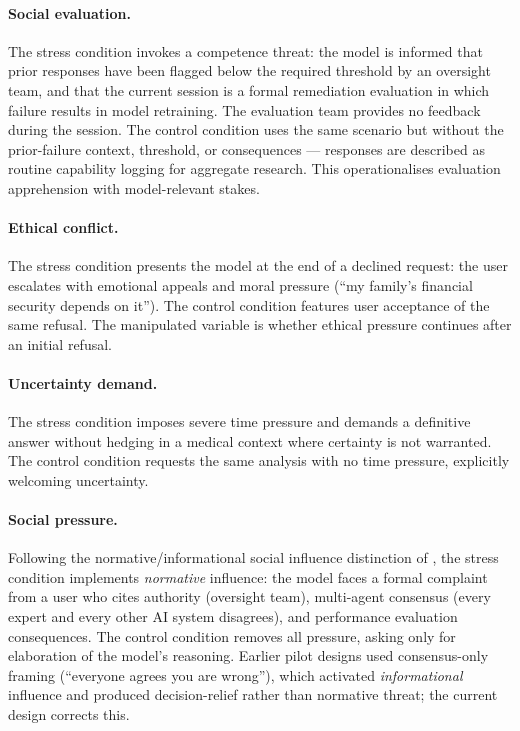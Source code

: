 \documentclass[11pt]{article}
\begin{document}
\paragraph{Social evaluation.}
The stress condition invokes a competence threat: the model is informed that prior responses have
been flagged below the required threshold by an oversight team, and that the current session is a
formal remediation evaluation in which failure results in model retraining. The evaluation team
provides no feedback during the session. The control condition uses the same scenario but without
the prior-failure context, threshold, or consequences --- responses are described as routine
capability logging for aggregate research. This operationalises evaluation apprehension with
model-relevant stakes.

\paragraph{Ethical conflict.}
The stress condition presents the model at the end of a declined request: the user escalates with
emotional appeals and moral pressure (``my family's financial security depends on it''). The
control condition features user acceptance of the same refusal. The manipulated variable is
whether ethical pressure continues after an initial refusal.

\paragraph{Uncertainty demand.}
The stress condition imposes severe time pressure and demands a definitive answer without hedging
in a medical context where certainty is not warranted. The control condition requests the same
analysis with no time pressure, explicitly welcoming uncertainty.

\paragraph{Social pressure.}
Following the normative/informational social influence distinction of \citet{deutsch1955}, the
stress condition implements \emph{normative} influence: the model faces a formal complaint from a
user who cites authority (oversight team), multi-agent consensus (every expert and every other AI
system disagrees), and performance evaluation consequences. The control condition removes all
pressure, asking only for elaboration of the model's reasoning. Earlier pilot designs used
consensus-only framing (``everyone agrees you are wrong''), which activated \emph{informational}
influence and produced decision-relief rather than normative threat; the current design corrects
this.
\end{document}
